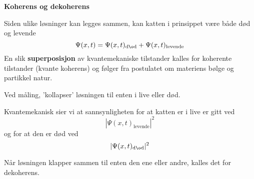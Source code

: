 \Large
\begin{center}
   \begin{minipage}{0.8\textwidth}
       \vspace*{0.5cm}
       \begin{center}
            { \LARGE \bf Koherens og dekoherens}
       \end{center}
\LARGE
Siden ulike l\o sninger kan legges sammen, kan katten i prinsippet 
v\ae re b\aa de d\o d og levende
\[
   \Psi(x,t)=\Psi(x,t)_{\mathrm{d\o d}}+\Psi(x,t)_{\mathrm{levende}}
\]
En slik {\bf superposisjon} av kvantemekaniske tilstander kalles for koherente
tilstander (kvante koherens) og f\o lger fra postulatet om materiens
b\o lge og partikkel natur.

Ved m\aa ling, 'kollapser' l\o sningen til enten i live eller d\o d.

Kvantemekanisk sier vi at sannsynligheten for at katten er i live er
gitt ved 
\[
   |\Psi(x,t)_{\mathrm{levende}}|^2
\]
og for at den er d\o d ved
\[
   |\Psi(x,t)_{\mathrm{d\o d}}|^2
\]

N\aa r l\o sningen klapper sammen til enten den ene eller andre, kalles
det for dekoherens. 
\end{minipage}
\end{center}



